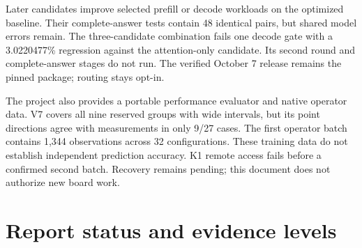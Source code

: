 \documentclass[10pt,a4paper]{article}
\begin{document}
Later candidates improve selected prefill or decode workloads on the
optimized baseline. Their complete-answer tests contain 48 identical
pairs, but shared model errors remain. The three-candidate combination
fails one decode gate with a 3.0220477\% regression against the
attention-only candidate. Its second round and complete-answer stages do
not run. The verified October 7 release remains the pinned package;
routing stays opt-in.

The project also provides a portable performance evaluator and native
operator data. V7 covers all nine reserved groups with wide intervals,
but its point directions agree with measurements in only 9/27 cases. The
first operator batch contains 1,344 observations across 32
configurations. These training data do not establish independent
prediction accuracy. K1 remote access fails before a confirmed second
batch. Recovery remains pending; this document does not authorize new
board work.

\hypertarget{report-status-and-evidence-levels}{%
\section{Report status and evidence
levels}\label{report-status-and-evidence-levels}}
\end{document}
